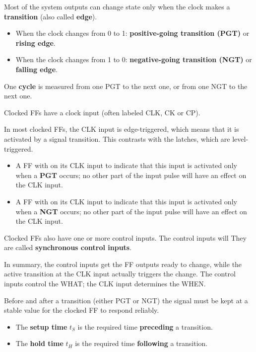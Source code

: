     \par Most of the system outputs can change state only when the clock makes
    a \textbf{transition} (also called \textbf{edge}).
    \begin{itemize}
      \item When the clock changes from 0 to 1: \textbf{positive-going
        transition (PGT)} or \textbf{rising edge}.
      \item When the clock changes from 1 to 0: \textbf{negative-going
        transition (NGT)} or \textbf{falling edge}.
    \end{itemize}
    \par One \textbf{cycle} is measured from one PGT to the next one, or from
    one NGT to the next one.

    \par Clocked FFs have a clock input (often labeled CLK, CK or CP).
    \par In most clocked FFs, the CLK input is edge-triggered, which means
    that it is activated by a signal transition.
    This contrasts with the latches, which are level-triggered.
    \begin{itemize}
      \item A FF with  on its CLK input to indicate
        that this input is activated only when a \textbf{PGT} occurs;
        no other part of the input pulse will have an effect
        on the CLK input.
      \item A FF with  on its CLK input
      to indicate that this input is activated only when a \textbf{NGT}
      occurs; no other part of the input pulse will have an effect
      on the CLK input.
    \end{itemize}
    \par Clocked FFs also have one or more control inputs. The control
    inputs will  They are called \textbf{synchronous control inputs}.
    \par In summary, the control inputs get the FF outputs ready to change,
    while the active transition at the CLK input actually triggers
    the change. The control inputs control the WHAT; the CLK input determines the WHEN.

    \par Before and after a transition (either PGT or NGT) the signal
    must be kept at a stable value for the clocked FF to respond reliably.
    \begin{itemize}
      \item The \textbf{setup time} $t_{S}$ is the required time
        \textbf{preceding} a transition.
      \item The \textbf{hold time} $t_{H}$ is the required time
        \textbf{following} a transition.
    \end{itemize}


